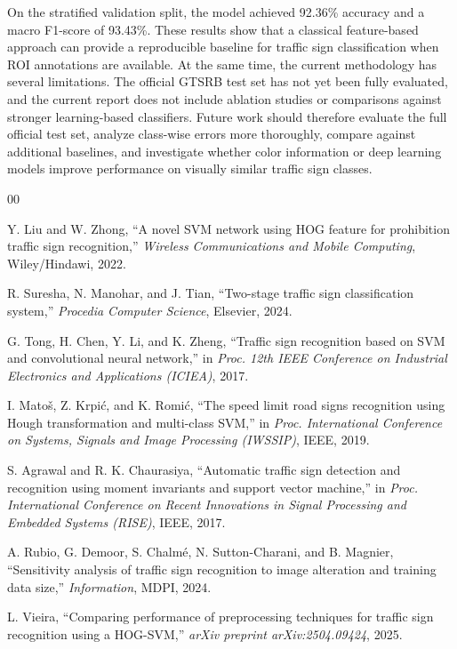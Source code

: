 \documentclass[conference]{IEEEtran}
\begin{document}
On the stratified validation split, the model achieved 92.36\% accuracy and a macro F1-score of 93.43\%. These results show that a classical feature-based approach can provide a reproducible baseline for traffic sign classification when ROI annotations are available. At the same time, the current methodology has several limitations. The official GTSRB test set has not yet been fully evaluated, and the current report does not include ablation studies or comparisons against stronger learning-based classifiers. Future work should therefore evaluate the full official test set, analyze class-wise errors more thoroughly, compare against additional baselines, and investigate whether color information or deep learning models improve performance on visually similar traffic sign classes.

\begin{thebibliography}{00}

Y. Liu and W. Zhong, ``A novel SVM network using HOG feature for prohibition traffic sign recognition,'' \emph{Wireless Communications and Mobile Computing}, Wiley/Hindawi, 2022.

R. Suresha, N. Manohar, and J. Tian, ``Two-stage traffic sign classification system,'' \emph{Procedia Computer Science}, Elsevier, 2024.

G. Tong, H. Chen, Y. Li, and K. Zheng, ``Traffic sign recognition based on SVM and convolutional neural network,'' in \emph{Proc. 12th IEEE Conference on Industrial Electronics and Applications (ICIEA)}, 2017.

I. Mato\v{s}, Z. Krpi\'c, and K. Romi\'c, ``The speed limit road signs recognition using Hough transformation and multi-class SVM,'' in \emph{Proc. International Conference on Systems, Signals and Image Processing (IWSSIP)}, IEEE, 2019.

S. Agrawal and R. K. Chaurasiya, ``Automatic traffic sign detection and recognition using moment invariants and support vector machine,'' in \emph{Proc. International Conference on Recent Innovations in Signal Processing and Embedded Systems (RISE)}, IEEE, 2017.

A. Rubio, G. Demoor, S. Chalm\'e, N. Sutton-Charani, and B. Magnier, ``Sensitivity analysis of traffic sign recognition to image alteration and training data size,'' \emph{Information}, MDPI, 2024.

L. Vieira, ``Comparing performance of preprocessing techniques for traffic sign recognition using a HOG-SVM,'' \emph{arXiv preprint arXiv:2504.09424}, 2025.


\end{thebibliography}
\end{document}
